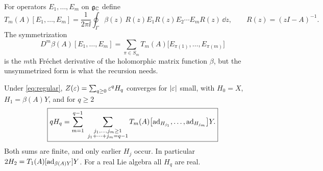 For operators $E_1,\ldots,E_m$ on $\mathfrak{g}_{\mathbb{C}}$ define
\begin{equation}\label{eq:frechet}
 T_m(A)[E_1,\ldots,E_m]
 =\frac1{2\pi\ii}\oint_\Gamma\beta(z)\,R(z)E_1R(z)E_2\cdots E_mR(z)\,\dd z,
 \qquad R(z)=(zI-A)^{-1}.
\end{equation}
The symmetrization
\[
 D^m\beta(A)[E_1,\ldots,E_m]=\sum_{\pi\in S_m}T_m(A)\bigl[E_{\pi(1)},\ldots,E_{\pi(m)}\bigr]
\]
is the $m$th Fr\'echet derivative of the holomorphic matrix function
$\beta$, but the unsymmetrized form is what the recursion needs.
\begin{theorem}\label{thm:Hqanalytic}
Under \eqref{eq:regular}, $Z(\varepsilon)=\sum_{q\geq0}\varepsilon^qH_q$ converges for
$|\varepsilon|$ small, with $H_0=X$, $H_1=\beta(A)Y$, and for $q\geq2$
\begin{equation}\label{eq:Hqanalytic}
 \boxed{\displaystyle
 qH_q=\sum_{m=1}^{q-1}\ \sum_{\substack{j_1,\ldots,j_m\geq1\\j_1+\cdots+j_m=q-1}}
 T_m(A)\bigl[\ad_{H_{j_1}},\ldots,\ad_{H_{j_m}}\bigr]Y.}
\end{equation}
Both sums are finite, and only earlier $H_j$ occur. In particular
$2H_2=T_1(A)[\operatorname{ad}_{\beta(A)Y}]Y$. For a real Lie algebra all $H_q$ are real.
\end{theorem}
